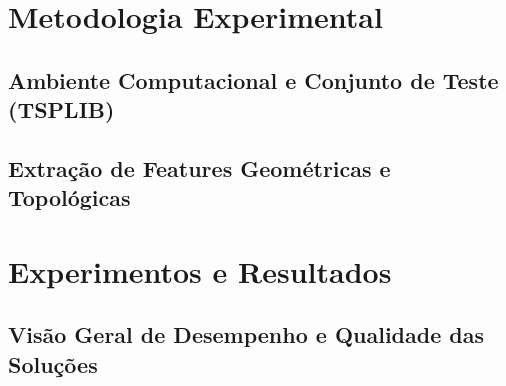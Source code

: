 \documentclass[12pt]{article}
\begin{document}
\section{Metodologia Experimental}

\subsection{Ambiente Computacional e Conjunto de Teste (TSPLIB)}

\subsection{Extração de Features Geométricas e Topológicas}

\section{Experimentos e Resultados}

\subsection{Visão Geral de Desempenho e Qualidade das Soluções}
\end{document}
